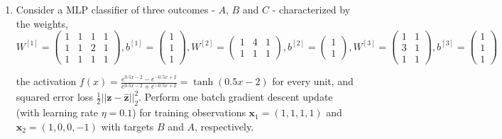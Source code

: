 \documentclass[12pt]{article}
\begin{document}
\begin{enumerate}[leftmargin=\labelsep]
    \item Consider a MLP classifier of three outcomes - $A$, $B$ and $C$ - characterized by the weights,
    \begin{equation}
        W^{[1]}=\begin{pmatrix}
            1 & 1 & 1 & 1 \\
            1 & 1 & 2 & 1 \\
            1 & 1 & 1 & 1
        \end{pmatrix}, b^{[1]} = \begin{pmatrix}
            1 \\
            1 \\
            1
        \end{pmatrix}, W^{[2]} = \begin{pmatrix}
            1 & 4 & 1 \\
            1 & 1 & 1
        \end{pmatrix}, b^{[2]} = \begin{pmatrix}
            1 \\
            1
        \end{pmatrix}, W^{[3]} = \begin{pmatrix}
            1 & 1 \\
            3 & 1 \\
            1 & 1
        \end{pmatrix}, b^{[3]} = \begin{pmatrix}
            1 \\
            1 \\
            1
        \end{pmatrix}
    \end{equation}

    the activation $f(x) = \frac{e^{0.5x-2}-e^{-0.5x+2}}{e^{0.5x-2}+e^{-0.5x+2}} = \tanh(0.5x-2)$ for every unit, and squared error loss $\frac{1}{2}||\mathbf{z}-\hat{\mathbf{z}}||^2_2$. Perform one batch gradient descent update (with learning rate $\eta = 0.1$) for training observations $\mathbf{x}_1 = (1, 1, 1, 1)$ and $\mathbf{x}_2 = (1, 0, 0, -1)$ with targets $B$ and $A$, respectively.


\end{enumerate}
\end{document}
